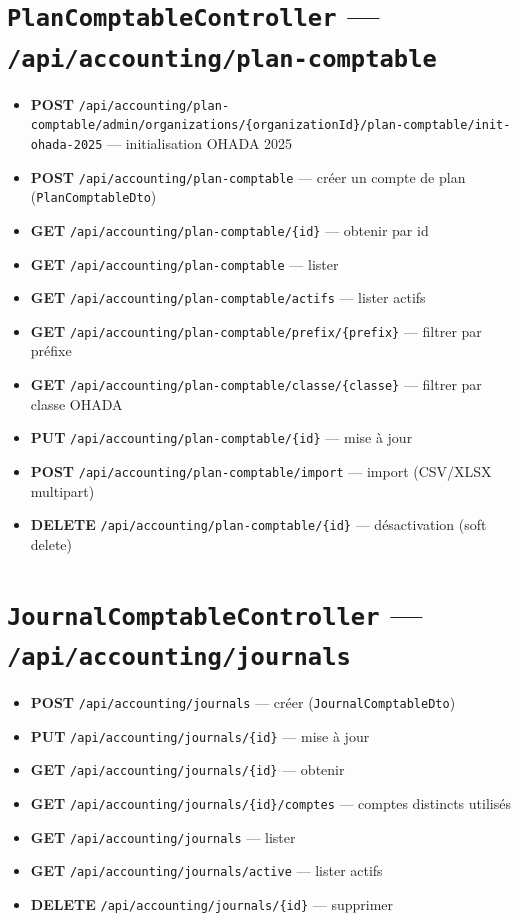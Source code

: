 \section{\texttt{PlanComptableController} --- \texttt{/api/accounting/plan-comptable}}
\begin{itemize}
  \item \textbf{POST} \texttt{/api/accounting/plan-comptable/admin/organizations/\{organizationId\}/plan-comptable/init-ohada-2025} --- initialisation OHADA 2025
  \item \textbf{POST} \texttt{/api/accounting/plan-comptable} --- créer un compte de plan (\texttt{PlanComptableDto})
  \item \textbf{GET} \texttt{/api/accounting/plan-comptable/\{id\}} --- obtenir par id
  \item \textbf{GET} \texttt{/api/accounting/plan-comptable} --- lister
  \item \textbf{GET} \texttt{/api/accounting/plan-comptable/actifs} --- lister actifs
  \item \textbf{GET} \texttt{/api/accounting/plan-comptable/prefix/\{prefix\}} --- filtrer par préfixe
  \item \textbf{GET} \texttt{/api/accounting/plan-comptable/classe/\{classe\}} --- filtrer par classe OHADA
  \item \textbf{PUT} \texttt{/api/accounting/plan-comptable/\{id\}} --- mise à jour
  \item \textbf{POST} \texttt{/api/accounting/plan-comptable/import} --- import (CSV/XLSX multipart)
  \item \textbf{DELETE} \texttt{/api/accounting/plan-comptable/\{id\}} --- désactivation (soft delete)
\end{itemize}

\section{\texttt{JournalComptableController} --- \texttt{/api/accounting/journals}}
\begin{itemize}
  \item \textbf{POST} \texttt{/api/accounting/journals} --- créer (\texttt{JournalComptableDto})
  \item \textbf{PUT} \texttt{/api/accounting/journals/\{id\}} --- mise à jour
  \item \textbf{GET} \texttt{/api/accounting/journals/\{id\}} --- obtenir
  \item \textbf{GET} \texttt{/api/accounting/journals/\{id\}/comptes} --- comptes distincts utilisés
  \item \textbf{GET} \texttt{/api/accounting/journals} --- lister
  \item \textbf{GET} \texttt{/api/accounting/journals/active} --- lister actifs
  \item \textbf{DELETE} \texttt{/api/accounting/journals/\{id\}} --- supprimer
\end{itemize}

